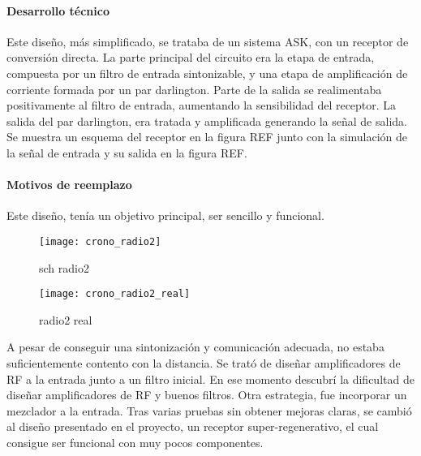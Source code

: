\paragraph{Desarrollo técnico}
Este diseño, más simplificado, se trataba de un sistema ASK, con un receptor de conversión directa. 
La parte principal del circuito era la etapa de entrada, compuesta por un filtro de entrada sintonizable, y una etapa de amplificación de corriente formada por un par darlington. Parte de la salida se realimentaba positivamente al filtro de entrada, aumentando la sensibilidad del receptor. La salida del par darlington, era tratada y amplificada generando la señal de salida. 
Se muestra un esquema del receptor en la figura REF junto con la simulación de la señal de entrada y su salida en la figura REF.
\paragraph{Motivos de reemplazo}
Este diseño, tenía un objetivo principal, ser sencillo y funcional.
\begin{figure}[h!]
    \centering
    \texttt{[image: crono\_radio2]}
    \caption{sch radio2}
    \label{fig:simrx_zoom}
\end{figure}

\begin{figure}[h!]
    \centering
    \texttt{[image: crono\_radio2\_real]}
    \caption{radio2 real}
    \label{fig:simrx_zoom}
\end{figure}
A pesar de conseguir una sintonización y comunicación adecuada, no estaba suficientemente contento con la distancia. Se trató de diseñar amplificadores de RF a la entrada junto a un filtro inicial. En ese momento descubrí la dificultad de diseñar amplificadores de RF y buenos filtros. Otra estrategia, fue incorporar un mezclador a la entrada. Tras varias pruebas sin obtener mejoras claras, se cambió al diseño presentado en el proyecto, un receptor super-regenerativo, el cual consigue ser funcional con muy pocos componentes.
